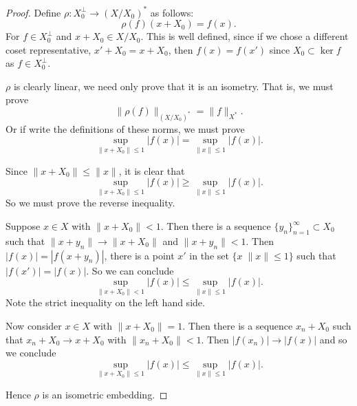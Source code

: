 \documentclass{unswmaths}
\begin{document}
\begin{proof}
    Define $\rho:X_0^\perp \rightarrow (X/X_0)^*$ as follows:
    \begin{equation*}
        \rho(f)(x+X_0) = f(x).
    \end{equation*}
    For $f \in X_0^\perp$ and $x + X_0 \in X/X_0$. This is well defined,
    since if we chose a different coset representative, $x' + X_0 = x+X_0$, then
    $f(x) = f(x')$ since $X_0 \subset \ker f$ as $f \in X_0^\perp$.
    
    $\rho$ is clearly linear, we need only prove that it is an isometry. That is,
    we must prove
    \begin{equation*}
        \| \rho(f) \|_{(X/X_0)^*} = \|f\|_{X^*}.
    \end{equation*}
    Or if write the definitions of these norms, we must prove
    \begin{equation*}
        \sup_{\|x+X_0\|\leq 1} |f(x)| = \sup_{\|x\|\leq 1} |f(x)|.
    \end{equation*}
    
    Since $\|x+X_0\| \leq \|x\|$, it is clear that
    \begin{equation*}
        \sup_{\|x+X_0\|\leq 1} |f(x)| \geq \sup_{\|x\|\leq 1} |f(x)|.
    \end{equation*}
    So we must prove the reverse inequality.
    
    Suppose $x \in X$ with $\|x+X_0\| < 1$. Then there is a sequence $\{y_n\}_{n=1}^\infty \subset X_0$
    such that $\|x+y_n\| \rightarrow \|x+X_0\|$ and $\|x+y_n\| < 1$. Then $|f(x)| = |f(x+y_n)|$,
    there is a point $x'$ in the set $\{ x\; \|x\| \leq 1\}$ such that $|f(x')| = |f(x)|$. 
    So we can conclude
    \begin{equation*}
                \sup_{\|x+X_0\| < 1} |f(x)| \leq \sup_{\|x\|\leq 1} |f(x)|.
    \end{equation*}
    Note the strict inequality on the left hand side.
    
    Now consider $x \in X$ with $\|x+X_0\| = 1$. Then there is a sequence $x_n+X_0$
    such that $x_n + X_0\rightarrow x+X_0$ with $\|x_n+X_0\| < 1$. Then $|f(x_n)| \rightarrow |f(x)|$
    and so we conclude 
    \begin{equation*}
                \sup_{\|x+X_0\| \leq 1} |f(x)| \leq \sup_{\|x\|\leq 1} |f(x)|.
    \end{equation*}
    
    Hence $\rho$ is an isometric embedding.
\end{proof}
\end{document}
